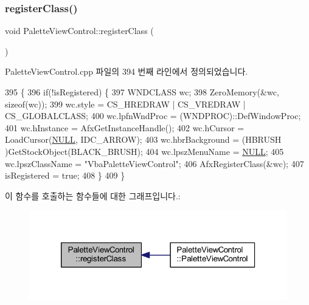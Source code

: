 \subsubsection{\texorpdfstring{register\+Class()}{registerClass()}}
{\footnotesize\ttfamily void Palette\+View\+Control\+::register\+Class (\begin{DoxyParamCaption}{ }\end{DoxyParamCaption})}



Palette\+View\+Control.\+cpp 파일의 394 번째 라인에서 정의되었습니다.


\begin{DoxyCode}
395 \{
396   \textcolor{keywordflow}{if}(!isRegistered) \{
397     WNDCLASS wc;
398     ZeroMemory(&wc, \textcolor{keyword}{sizeof}(wc));
399     wc.style = CS\_HREDRAW | CS\_VREDRAW | CS\_GLOBALCLASS;
400     wc.lpfnWndProc = (WNDPROC)::DefWindowProc;
401     wc.hInstance = AfxGetInstanceHandle();
402     wc.hCursor = LoadCursor(\mbox{\hyperlink{getopt1_8c_a070d2ce7b6bb7e5c05602aa8c308d0c4}{NULL}}, IDC\_ARROW);
403     wc.hbrBackground = (HBRUSH )GetStockObject(BLACK\_BRUSH);
404     wc.lpszMenuName = \mbox{\hyperlink{getopt1_8c_a070d2ce7b6bb7e5c05602aa8c308d0c4}{NULL}};
405     wc.lpszClassName = \textcolor{stringliteral}{"VbaPaletteViewControl"};
406     AfxRegisterClass(&wc);
407     isRegistered = \textcolor{keyword}{true};
408   \}
409 \}
\end{DoxyCode}
이 함수를 호출하는 함수들에 대한 그래프입니다.\+:
\nopagebreak
\begin{figure}[H]
\begin{center}
\leavevmode
\includegraphics[width=320pt]{class_palette_view_control_add54d86e21f3acfcdc129dd656109c83_icgraph}
\end{center}
\end{figure}
\mbox{\label{class_palette_view_control_adbcdd372f28027690355099e14b669d1}} 
